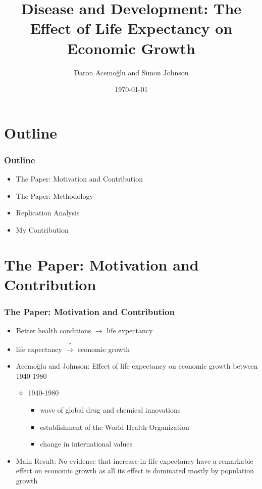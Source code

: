 \documentclass{beamer}
\title{Disease and Development: The Effect of Life Expectancy on Economic Growth}
\author{Daron Acemo\u{g}lu and Simon Johnson}
\institute{Dil\c{s}at Dalk{\i}ran-Ozel}
\date{\today}
\begin{document}
\begin{frame}
\titlepage
\end{frame}

\section{Outline} 
\begin{frame}
\frametitle{Outline} 
\begin{itemize}
\item The Paper: Motivation and Contribution
\item The Paper: Methodology
\item Replication Analysis
\item My Contribution
\end{itemize}
\end{frame}

\section{The Paper: Motivation and Contribution}
\begin{frame}
\frametitle{The Paper: Motivation and Contribution}
\begin{itemize}
\item Better health conditions $\rightarrow$ life expectancy
\item life expectancy $\xrightarrow{?}$ economic growth 
\item Acemo\u{g}lu and Johnson: Effect of life expectancy on economic growth between 1940-1980
\begin{itemize}
\item 1940-1980
\begin{itemize}
\item wave of global drug and chemical innovations
\item establishment of the World Health Organization
\item change in international values
\end{itemize}
\end{itemize}
\item Main Result: No evidence that increase in life expectancy have a remarkable effect on economic growth as all its effect is dominated mostly by population growth
\end{itemize}
\end{frame}
\end{document}
